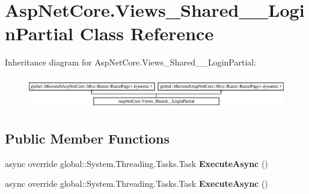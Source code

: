 \hypertarget{class_asp_net_core_1_1_views___shared_____login_partial}{}\section{Asp\+Net\+Core.\+Views\+\_\+\+Shared\+\_\+\+\_\+\+Login\+Partial Class Reference}
\label{class_asp_net_core_1_1_views___shared_____login_partial}
Inheritance diagram for Asp\+Net\+Core.\+Views\+\_\+\+Shared\+\_\+\+\_\+\+Login\+Partial\+:\begin{figure}[H]
\begin{center}
\leavevmode
\includegraphics[height=1.432225cm]{class_asp_net_core_1_1_views___shared_____login_partial}
\end{center}
\end{figure}
\subsection*{Public Member Functions}
\begin{DoxyCompactItemize}
\item 
\mbox{\label{class_asp_net_core_1_1_views___shared_____login_partial_a0a2047dd3276b1cccf055f951c3eeddc}} 
async override global\+::\+System.\+Threading.\+Tasks.\+Task {\bfseries Execute\+Async} ()
\item 
\mbox{\label{class_asp_net_core_1_1_views___shared_____login_partial_a0a2047dd3276b1cccf055f951c3eeddc}} 
async override global\+::\+System.\+Threading.\+Tasks.\+Task {\bfseries Execute\+Async} ()
\end{DoxyCompactItemize}
